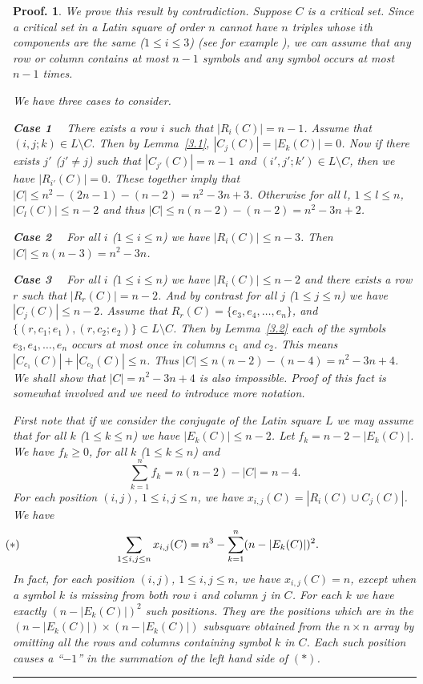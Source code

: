\documentclass[12pt]{report}
\newtheorem{preproof}{{\bf Proof.}}
\newenvironment{proof}[1]{\begin{preproof}{\rm
               #1}\hfill{\rule[-0.5mm]{2mm}{2mm}}}{\end{preproof}}
\begin{document}
\begin{proof}{
We prove this result by contradiction. Suppose $C$ is a critical set.
Since a critical set in a Latin square of order $n$ cannot have $n$
triples whose $i$th components are the same ($1 \leq i \leq 3$)
(see for example \cite{MR80j:05022}),
we can assume that any row or column contains at most $n-1$ symbols
and any symbol occurs at most $n-1$ times.

We have three cases to consider.

\noindent
{\bf Case 1 \ }
There exists a row $i$ such that $|R_{i}(C)| = n-1$. Assume that
$(i,j;k) \in L\setminus C.$
Then by Lemma~\ref{3.1}, $|C_{j}(C)| = |E_{k}(C)| =  0$.
Now if there exists $j'$ ($j' \neq j$) such that $|C_{j'}(C)| = n-1$
and $(i', j'; k') \in L\setminus C$,
then we have $|R_{i'}(C)| = 0$. These together imply that
$|C| \le n^2 - (2n-1)-(n-2)=n^2 - 3n + 3$.  Otherwise
for all $l$, $1 \leq l \leq n$, $|C_{l}(C)| \leq n-2$ and thus
$|C|\leq  n(n -2) -(n-2) =  n^2 - 3n + 2$.

\noindent
{\bf Case 2 \ }
For all $i$ ($1\le i \le n$) we have $|R_{i}(C)| \leq n-3$. Then
$|C| \leq n(n - 3) = n^2 - 3n$.

\noindent
{\bf Case 3 \ } For all $i$ ($1\le i \le n$) we have $|R_i(C)| \leq n-2$ and
there exists a row $r$ such that $|R_{r}(C)| = n-2$.
And by contrast for all $j$ ($1\le j \le n$) we have $|C_j(C)| \leq n-2$.
Assume that $R_r(C) = \{e_{3},e_{4}, \dots, e_{n}\}$,
and $\{(r, c_{1}; e_{1}), (r, c_{2}; e_{2})\}\subset L\setminus C $.
Then by Lemma~\ref{3.2}
each of the symbols $e_{3}, e_4, \dots, e_{n}$
occurs at most once in columns $c_{1}$ and $c_{2}$.   This means
$|C_{c_{1}}(C)| + |C_{c_{2}}(C)| \leq n$. Thus
$|C|\leq  n(n -2) -(n -4) =  n^2 - 3n + 4$.
We shall show that $|C| =  n^2 - 3n + 4$ is also impossible. Proof of this fact
is somewhat involved and we need to introduce more notation.

First note that if we consider the conjugate of the Latin square $L$
we may assume that for all $k$ ($1\le k \le n$) we have $|E_k(C)| \leq n-2$.
Let  $f_k = n-2 - |E_k(C)|$. We have $f_k \ge 0$, for all $k$ ($1\le k \le n$)
and
\begin{displaymath}
\sum_{k=1}^{n}
f_k = n(n-2)- |C|= n-4.
\end{displaymath}
For each position $(i,j)$, $1 \leq i,j \leq n$, we have $x_{i,j}(C) = |R_i(C) \cup C_j(C)|$.
We have
\begin{displaymath}
\hspace*{-3.3cm}
(*)
\hspace*{3cm}
\sum_{1 \le i,j \le n}
x_{i,j}(C)= n^3 - \sum_{k=1}^{n}(n-|E_k(C)|)^2.
\end{displaymath}
In fact, for each position $(i,j)$, $1 \leq i,j \leq n$, we have $x_{i,j}(C) = n$, except when a
symbol $k$ is missing from {\it both}
row $i$ and column $j$ in $C$.
For each $k$ we have
exactly $(n-|E_k(C)|)^2$  such positions. They are the positions which are in
the $(n-|E_k(C)|) \times (n-|E_k(C)|)$ subsquare obtained from the $n \times n$
array by omitting all the rows and columns containing symbol $k$ in $C$.
Each such position causes a ``$-1$'' in the summation of the
left hand side of $(*)$.

}
\end{proof}
\end{document}
